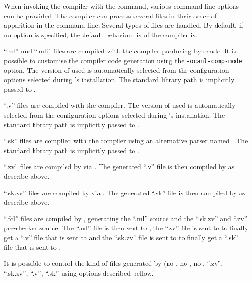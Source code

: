 \label{compiler-options}
When invoking the {\focal} compiler with the {\focalizec} command,
various command line options can be provided. The compiler can process
several files in their order of apparition in the command line.
Several types of files are handled. By default, if no option is
specified, the default behaviour is of the compiler is:
\begin{compact-itemize}
  \item ``.ml'' and ``.mli'' files are compiled with the {\ocaml}
    compiler producing bytecode. It is possible to customise the
    compiler code generation using the {\tt -ocaml-comp-mode} option.
    The version of {\ocaml} used is automatically selected from the
    configuration options selected during {\focal}'s
    installation. The {\focal} standard library path is implicitly
    passed to {\ocaml}.
    \item ``.v'' files are compiled with the {\coq} compiler. The
      version of {\coq} used is automatically selected from the
      configuration options selected during {\focal}'s installation.
      The {\focal} standard library path is implicitly passed to
      {\coq}.
    \item ``.sk'' files are compiled with the {\dedukti} compiler using an alternative parser named {\sukerujo}.
      The {\focal} standard library path is implicitly passed to
      {\dedukti}.
    \item ``.zv'' files are compiled by {\zenon} via {\zvtov}. The
      generated ``.v'' file is then compiled by {\coq} as describe
      above.
    \item ``.sk.zv'' files are compiled by {\zmod} via {\zvtov}. The
      generated ``.sk'' file is then compiled by {\dedukti} as describe
      above.
    \item ``.fcl'' files are compiled by {\focalizec}, generating
      the ``.ml'' {\ocaml} source and the ``.sk.zv'' and ``.zv'' pre-checker source. The
      ``.ml'' file is then sent to {\ocaml}, the ``.zv'' file is sent
      to {\zenon} to finally get a ``.v'' file that is sent to {\coq} and
      the ``.sk.zv'' file is sent to {\zmod} to finally get a ``.sk'' file
      that is sent to {\dedukti}.
\end{compact-itemize}
It is possible to control the kind of files generated by
{\focalizec} (no {\coq}, no {\dedukti}, no {\ocaml}, ``.zv'', ``.sk.zv'', ``.v'', ``.sk'' using options
described bellow.

